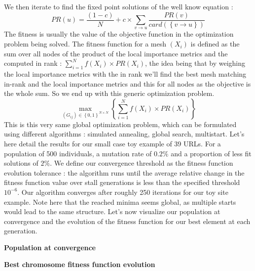 \documentclass{iSWAGArticle}
\begin{document}
We then iterate to find the fixed point solutions of the well know equation :
\begin{equation}
PR\left(u\right)= \frac{\left(1-c\right)}{N} + c \times \sum_{v \rightarrow u}\frac{PR\left(v\right)}{card\left(\left\{v\rightarrow u\right\}\right)}
\end{equation}
The fitness is usually the value of the objective function in the optimization problem being solved.
The fitness function for a mesh $\left(X_i\right)$ is defined as the sum over all nodes of the product of the local importance metrics
and the computed in rank : $\sum^{N}_{i=1} f\left(X_i\right)\times PR(X_i)$, the idea being that by weighing the local importance metrics with the in rank
we'll find the best mesh matching in-rank and the local importance metrics and this for all nodes as the objective is the whole sum. 
So we end up with this generic optimization problem.
\begin{equation}
\max_{\left(G_{ij}\right)  \in \left\{0,1\right\}^{N\times N}}\left\{ \sum^{N}_{i=1} f\left(X_i\right)\times PR(X_i)\right\}
\end{equation}
This is this very same global optimization problem, which can be formulated using different algorithms : simulated annealing, global search, multistart.
Let's here detail the results for our small case toy example of 39 URLs.
For a population of 500 individuals, a mutation rate of $0.2 \%$ and a proportion of less fit solutions of $2\%$.
We define our convergence threshold as the fitness function evolution tolerance : the algorithm runs until the average relative change in the fitness function value over stall generations is less than the specified 
threshold $10^{-6}$.
Our algorithm converges after roughly 250 iterations for our toy site example. Note here that the reached minima seems global, as multiple starts
would lead to the same structure.
Let's now visualize our population at convergence and the evolution of the fitness function for our best element at each generation.

\begin{center}
\textbf{\large Population at convergence}
\end{center}
\begin{center}
\end{center}
\begin{center}
\textbf{\large Best chromosome fitness function evolution}
\end{center}
\begin{center}
\end{center}
\end{document}
